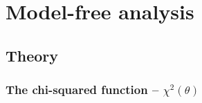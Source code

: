 
\chapter{Model-free analysis}
\label{ch: model-free}




\section{Theory}



\begin{latexonly}
    \subsection{The chi-squared function -- $\chi^2(\theta)$}
\end{latexonly}

